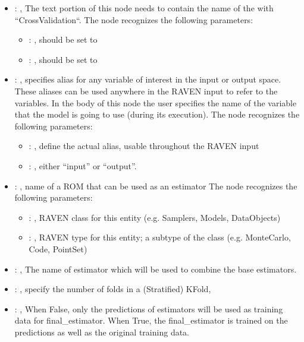 \begin{itemize}
    \item {}: , 
      The text portion of this node needs to contain the name of the  with
               ``CrossValidation``.
      The  node recognizes the following parameters:
        \begin{itemize}
          \item {}: , 
            should be set to 
          \item {}: , 
            should be set to 
      \end{itemize}

    \item {}: , 
      specifies alias for         any variable of interest in the input or output space. These
      aliases can be used anywhere in the RAVEN input to         refer to the variables. In the body
      of this node the user specifies the name of the variable that the model is going to use
      (during its execution).
      The  node recognizes the following parameters:
        \begin{itemize}
          \item {}: , 
            define the actual alias, usable throughout the RAVEN input
          \item {}: , 
            either ``input'' or ``output''.
      \end{itemize}

    \item {}: , 
      name of a ROM that can be used as an estimator
      The  node recognizes the following parameters:
        \begin{itemize}
          \item {}: , 
            RAVEN class for this entity (e.g. Samplers, Models, DataObjects)
          \item {}: , 
            RAVEN type for this entity; a subtype of the class (e.g. MonteCarlo, Code, PointSet)
      \end{itemize}

    \item {}: , 
      The name of estimator which will be used to combine the base estimators.

    \item {}: , 
      specify the number of folds in a (Stratified) KFold,

    \item {}: , 
      When False, only the predictions of estimators will be used as training
      data for final\_estimator. When True, the final\_estimator is trained on the predictions
      as well as the original training data.
  \end{itemize}
